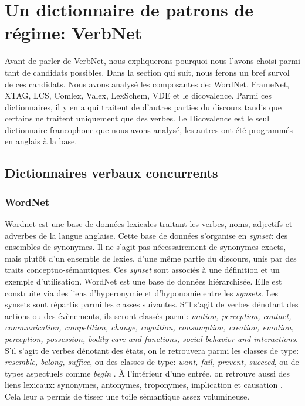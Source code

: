 
\chapter{Un dictionnaire de patrons de régime: VerbNet}

Avant de parler de VerbNet, nous expliquerons pourquoi nous l'avons choisi parmi tant de candidats possibles. Dans la section qui suit, nous ferons un bref survol de ces candidats. Nous avons analysé les composantes de: WordNet, FrameNet, XTAG, LCS, Comlex, Valex, LexSchem, VDE et le dicovalence. Parmi ces dictionnaires, il y en a qui traitent de d'autres parties du discours tandis que certains ne traitent uniquement que des verbes. Le Dicovalence est le seul dictionnaire francophone que nous avons analysé, les autres ont été programmés en anglais à la base.

\section{Dictionnaires verbaux concurrents}

\subsection{WordNet}
Wordnet \citep{Fellbaum1998} est une base de données lexicales traitant les verbes, noms, adjectifs et adverbes de la langue anglaise. Cette base de données s'organise en \emph{synset}: des ensembles de synonymes. Il ne s'agit pas nécessairement de synonymes exacts, mais plutôt d'un ensemble de lexies, d'une même partie du discours, unis par des traits conceptuo-sémantiques. Ces \emph{synset} sont associés à une définition et un exemple d'utilisation. WordNet est une base de données hiérarchisée. Elle est construite via des liens d'hyperonymie et d'hyponomie entre les \emph{synsets}. Les synsets sont répartis parmi les classes suivantes. S'il s'agit de verbes dénotant des actions ou des évènements, ils seront classés parmi: \emph{ motion, perception, contact, communication, competition, change, cognition, consumption, creation, emotion, perception, possession, bodily care and functions, social behavior and interactions}. S'il s'agit de verbes dénotant des états, on le retrouvera parmi les classes de type: \emph{resemble, belong, suffice}, ou des classes de type: \emph{want, fail, prevent, succeed}, ou de types aspectuels comme \emph{begin} \citep{Fellbaum1998}. À l'intérieur d'une entrée, on retrouve aussi des liens lexicaux: synonymes, antonymes, troponymes, implication et causation \citep{SchulerVerbnetBroadcoverageComprehensive2005}. Cela leur a permis de tisser une toile sémantique assez volumineuse.

